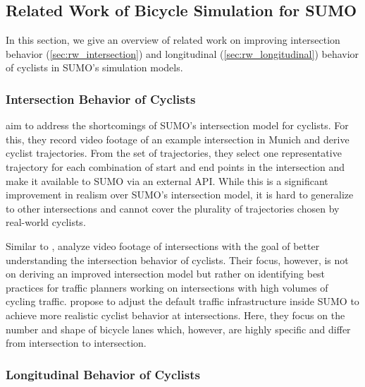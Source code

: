 \subsection{Related Work of Bicycle Simulation for SUMO}
\label{subsec:related_work_sumo}
In this section, we give an overview of related work on improving intersection behavior (\cref{sec:rw_intersection}) and longitudinal (\cref{sec:rw_longitudinal}) behavior of cyclists in SUMO's simulation models.

\subsubsection{Intersection Behavior of Cyclists}%
\label{subsubsec:rw_intersection}

\textcite{kaths2016integration} aim to address the shortcomings of SUMO's intersection model for cyclists.
For this, they record video footage of an example intersection in Munich and derive cyclist trajectories.
From the set of trajectories, they select one representative trajectory for each combination of start and end points in the intersection and make it available to SUMO via an external API.
While this is a significant improvement in realism over SUMO's intersection model, it is hard to generalize to other intersections and cannot cover the plurality of trajectories chosen by real-world cyclists.


Similar to \textcite{kaths2016integration}, \textcite{grigoropoulos2022traffic} analyze video footage of intersections with the goal of better understanding the intersection behavior of cyclists.
Their focus, however, is not on deriving an improved intersection model but rather on identifying best practices for traffic planners working on intersections with high volumes of cycling traffic.
\textcite{grigoropoulos2019modelling} propose to adjust the default traffic infrastructure inside SUMO to achieve more realistic cyclist behavior at intersections.
Here, they focus on the number and shape of bicycle lanes which, however, are highly specific and differ from intersection to intersection.

\subsubsection{Longitudinal Behavior of Cyclists}%
\label{subsubsec:rw_longitudinal}

